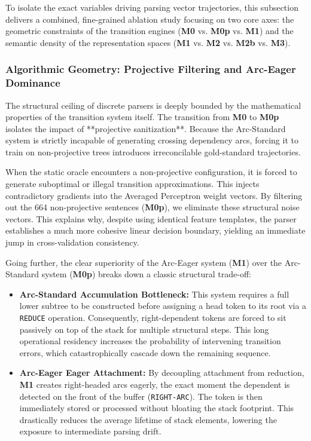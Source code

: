 \documentclass[12pt,a4paper]{article}
\begin{document}
To isolate the exact variables driving parsing vector trajectories, this subsection delivers a combined, fine-grained ablation study focusing on two core axes: the geometric constraints of the transition engines (\textbf{M0} vs. \textbf{M0p} vs. \textbf{M1}) and the semantic density of the representation spaces (\textbf{M1} vs. \textbf{M2} vs. \textbf{M2b} vs. \textbf{M3}).

\subsubsection{Algorithmic Geometry: Projective Filtering and Arc-Eager Dominance}
The structural ceiling of discrete parsers is deeply bounded by the mathematical properties of the transition system itself. The transition from \textbf{M0} to \textbf{M0p} isolates the impact of **projective sanitization**. Because the Arc-Standard system is strictly incapable of generating crossing dependency arcs, forcing it to train on non-projective trees introduces irreconcilable gold-standard trajectories. 

When the static oracle encounters a non-projective configuration, it is forced to generate suboptimal or illegal transition approximations. This injects contradictory gradients into the Averaged Perceptron weight vectors. By filtering out the 664 non-projective sentences (\textbf{M0p}), we eliminate these structural noise vectors. This explains why, despite using identical feature templates, the parser establishes a much more cohesive linear decision boundary, yielding an immediate jump in cross-validation consistency.

Going further, the clear superiority of the Arc-Eager system (\textbf{M1}) over the Arc-Standard system (\textbf{M0p}) breaks down a classic structural trade-off:
\begin{itemize}
    \item \textbf{Arc-Standard Accumulation Bottleneck:} This system requires a full lower subtree to be constructed before assigning a head token to its root via a \texttt{REDUCE} operation. Consequently, right-dependent tokens are forced to sit passively on top of the stack for multiple structural steps. This long operational residency increases the probability of intervening transition errors, which catastrophically cascade down the remaining sequence.
    \item \textbf{Arc-Eager Eager Attachment:} By decoupling attachment from reduction, \textbf{M1} creates right-headed arcs eagerly, the exact moment the dependent is detected on the front of the buffer (\texttt{RIGHT-ARC}). The token is then immediately stored or processed without bloating the stack footprint. This drastically reduces the average lifetime of stack elements, lowering the exposure to intermediate parsing drift.
\end{itemize}
\end{document}
